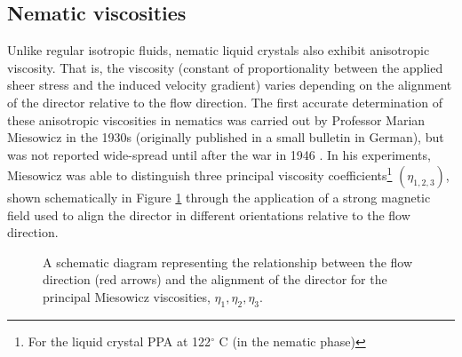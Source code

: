 \subsection{Nematic viscosities}
Unlike regular isotropic fluids, nematic liquid crystals also exhibit anisotropic viscosity. That is, the viscosity (constant of proportionality between the applied sheer stress and the induced velocity gradient) varies depending on the alignment of the director relative to the flow direction.
The first accurate determination of these anisotropic viscosities in nematics was carried out by Professor Marian Miesowicz in the 1930s (originally published in a small bulletin in German), but was not reported wide-spread until after the war in 1946 \cite{Miesowicz1946}. In his experiments, Miesowicz was able to distinguish three principal viscosity coefficients\footnote{For the liquid crystal PPA at 122$^{\circ}$ C (in the nematic phase)} $\left(\eta_{1,2,3}\right)$, shown schematically in Figure \ref{fig:eta} through the application of a strong magnetic field used to align the director in different orientations relative to the flow direction.

\begin{figure}
\begin{center}
\end{center}
\caption[Schematic depiction of the Miesowicz viscosities, $\eta_1,\eta_2,\eta_3$]{\label{fig:eta}A schematic diagram representing the relationship between the flow direction (red arrows) and the alignment of the director for the principal Miesowicz viscosities, $\eta_1,\eta_2,\eta_3$.}
\end{figure}

